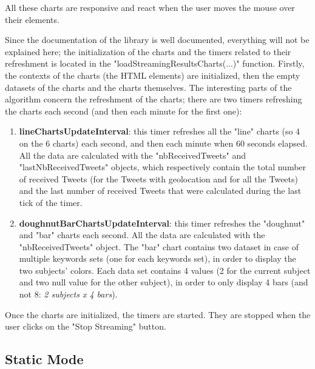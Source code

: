 \documentclass[a4paper,11pt]{report}
\begin{document}
All these charts are responsive and react when the user moves the mouse over their elements.
\newpage

Since the documentation of the library is well documented, everything will not be explained here; the initialization of the charts and the timers related to their refreshment is located in the "loadStreamingResultsCharts(...)" function. Firstly, the contexts of the charts (the HTML elements) are initialized, then the empty datasets of the charts and the charts themselves. The interesting parts of the algorithm concern the refreshment of the charts; there are two timers refreshing the charts each second (and then each minute for the first one): 
\begin{enumerate}
	\item \textbf{lineChartsUpdateInterval}: this timer refreshes all the "line" charts (so 4 on the 6 charts) each second, and then each minute when 60 seconds elapsed. All the data are calculated with the "nbReceivedTweets" and "lastNbReceivedTweets" objects, which respectively contain the total number of received Tweets (for the Tweets with geolocation and for all the Tweets) and the last number of received Tweets that were calculated during the last tick of the timer.
	\item \textbf{doughnutBarChartsUpdateInterval}: this timer refreshes the "doughnut" and "bar" charts each second. All the data are calculated with the "nbReceivedTweets" object. The "bar" chart contains two dataset in case of multiple keywords sets (one for each keywords set), in order to display the two subjects' colors. Each data set contains 4 values (2 for the current subject and two null value for the other subject), in order to only display 4 bars (and not 8: \emph{2 subjects x 4 bars}).
\end{enumerate}

Once the charts are initialized, the timers are started. They are stopped when the user clicks on the "Stop Streaming" button.

\subsection{Static Mode}
\end{document}
